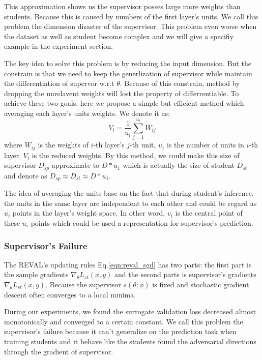 \documentclass[english]{sobraep}
\begin{document}
This approximation shows us the supervisor posses large more weights than students. Because this is caused by numbers of the first layer's units, We call this problem the dimension disaster of the supervisor. This problem even worse when the dataset as well as student become complex and we will give a specifiy example in the experiment section.

The key idea to solve this problem is by reducing the input dimension. But the constrain is that we need to keep the generlization of supervisor while maintain the differentiation of supervor w.r.t $\theta$. Because of this constrain, method by dropping the unrelavent weights will lost the property of differrentiable. To achieve these two goals, here we propose a simple but efficient method which averaging each layer's units weights. We denote it as:
\begin{equation*}
    V_i = \frac{1}{u_{i}}\sum_{j=1}^{u_i} W_{ij}
\end{equation*}
where $W_{ij}$ is the weights of $i$-th layer's $j$-th unit, $u_i$ is the number of units in $i$-th layer, $V_i$ is the reduced weights. By this method, we could make this size of supervisor $D_{sp}$ approximate to $D*u_{1}$ which is actually the size of student $D_{st}$ and denote as $D_{sp} \approx D_{st} \approx D * u_1$.

The idea of averaging the units base on the fact that during student's inference, the units in the same layer are independent to each other and could be regard as $u_i$ points in the layer's weight space. In other word, $v_i$ is the central point of these $u_i$ points which could be used a representation for supervisor's prediction.

\subsubsection{Supervisor's Failure}
The REVAL's updating rules Eq.\ref{eqn:reval_sgd} has two parts: the first part is the sample gradients $\nabla_{\theta}L_{st}(x,y)$ and the second parts is supervisor's gradients $\nabla_{\theta}L_{st}(x,y)$.
Because the supervisor $s(\theta;\phi) $ is fixed and stochastic gradient descent often converges to a local minima.

During our experiments, we found the surrogate validation loss decreased almost monotonically and converged to a certain constant. We call this problem the supervisor's failure because it can't generalize on the prediction task when training students and it behave like the students found the adversarial directions through the gradient of supervisor.
\end{document}
